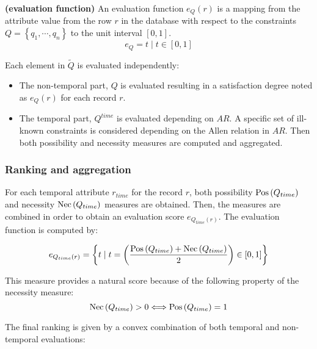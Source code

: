 \begin{definition}
\label{def:evaluation-function}
\textbf{(evaluation function)}
An evaluation function $e_{Q} \left( r \right)$ is a mapping from the attribute value from the row $r$ in the database with respect to the constraints $Q = \left \lbrace q_1, \cdots, q_n \right \rbrace$ to the unit interval $\left[ 0,1 \right]$. 
\begin{equation}
\label{eq:evaluation-function} 
e_{Q} = t \mid t \in \left[ 0,1 \right]
\end{equation}
\end{definition}

Each element in $\tilde{Q}$ is evaluated independently:
\begin{itemize}
\item
The non-temporal part, $Q$ is evaluated resulting in a satisfaction degree noted as $e_Q(r)$ for each record $r$.
\item
The temporal part, $Q^{time}$ is evaluated depending on $AR$. A specific set of ill-known constraints is considered depending on the Allen relation in $AR$. Then both possibility and necessity measures are computed and aggregated.
\end{itemize}

\subsubsection{Ranking and aggregation}
For each temporal attribute $r_{time}$ for the record $r$, both possibility $\operatorname{Pos} \left( Q_{time}\right)$ and necessity $\operatorname{Nec} \left( Q_{time} \right)$ measures are obtained. Then, the measures are combined in order to obtain an evaluation score $e_{Q_{time} \left( r \right)}$. The evaluation function is computed by:

\begin{equation}
\label{eq:temporal-eval}
e_{Q_{time} \left( r \right)} = \left \lbrace t \mid t = \left( \frac{\Pos \left( Q_{time}\right) + \Nec \left( Q_{time} \right)}{2} \right)   \in \left[ 0,1\right] \right \rbrace
\end{equation}

This measure provides a natural score because of the following property of the necessity measure: 
\begin{equation}
\label{eq:necessity} %
\Nec \left( Q_{time} \right) > 0  \Longleftrightarrow  \Pos \left( Q_{time}\right) = 1
\end{equation}

The final ranking is given by a convex combination of both temporal and non-temporal evaluations:

